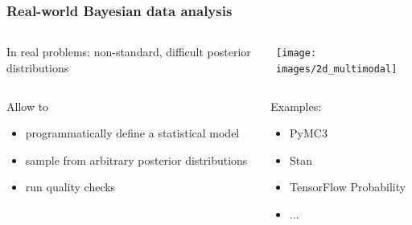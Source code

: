 \documentclass[t,aspectratio=169]{beamer}
\begin{document}
\begin{frame}
  \frametitle{Real-world Bayesian data analysis}
  \begin{columns}
    \begin{column}[T]{0.48\textwidth}
      In real problems: non-standard, difficult posterior distributions\\
    \end{column}
    \begin{column}[T]{0.48\textwidth}
      \texttt{[image: images/2d\_multimodal]}
    \end{column}
  \end{columns}
  \begin{columns}
    \begin{column}{0.6\textwidth}
      \begin{tcolorbox}[title=Probabilistic programming libraries]
        Allow to
        \begin{itemize}
        \item programmatically define a statistical model
        \item sample from arbitrary posterior distributions
        \item run quality checks
        \end{itemize}
      \end{tcolorbox}
    \end{column}
    \begin{column}{0.38\textwidth}
      \vfill
      Examples:
      \begin{itemize}
      \item PyMC3
      \item Stan
      \item TensorFlow Probability
      \item ...
      \end{itemize}
      \vfill
    \end{column}
  \end{columns}
\end{frame}
\end{document}
